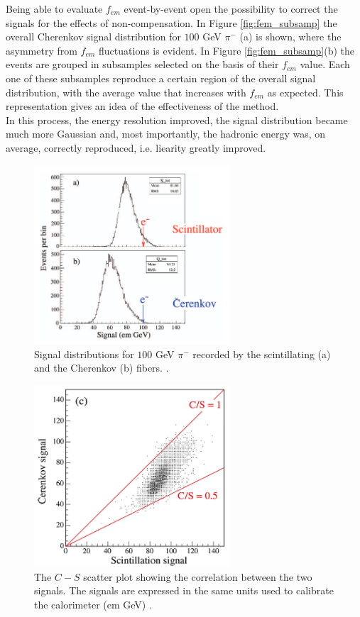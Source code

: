 Being able to evaluate $f_{em}$ event-by-event open the possibility to correct the signals for the effects of non-compensation.
In Figure \ref{fig:fem_subsamp} the overall Cherenkov signal distribution for $100$ GeV $\pi^-$ (a) is shown, where the asymmetry from $f_{em}$ fluctuations is evident. In Figure \ref{fig:fem_subsamp}(b) the events are grouped in subsamples selected on the basis of their $f_{em}$ value.
Each one of these subsamples reproduce a certain region of the overall signal distribution, with the average value that increases with $f_{em}$ as expected. This representation gives an idea of the effectiveness of the method.\\
In this process, the energy resolution improved, the signal distribution became much more Gaussian and, most importantly, the hadronic energy was, on average, correctly reproduced, i.e. liearity greatly improved.\\

\begin{figure}
	\centering
	\includegraphics[width=0.65\textwidth]{IMG/Cap2/SC_Dream_sig.png}
	\caption{Signal distributions for $100$ GeV $\pi^-$ recorded by the scintillating (a) and the Cherenkov (b) fibers. \cite{Wigmans_art_of_cal}.}
	\label{fig:SC_Dream_sig}
\end{figure}

\begin{figure}
	\centering
	\includegraphics[width=0.65\textwidth]{IMG/Cap2/theta_DREAM.png}
	\caption{The $C-S$ scatter plot showing the correlation between the two signals. The signals are expressed in the same units used to calibrate the calorimeter (em GeV) \cite{DREAM2}.}
	\label{fig:theta_DREAM}
\end{figure}

